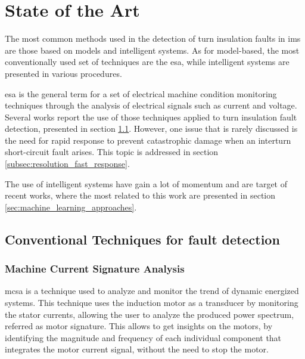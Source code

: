 \chapter{State of the Art}
\label{cha:state_of_the_art}

The most common methods used in the detection of turn insulation faults in \acrshort{ims} are those based on models and intelligent systems. As for model-based, the most conventionally used set of techniques are the \acrfull{esa}, while intelligent systems are presented in various 
procedures.

\acrshort{esa} is the general term for a set of electrical machine condition monitoring techniques through the analysis of electrical signals such as current and voltage. Several works report the use of those techniques applied to turn insulation fault detection, presented in section \ref{sec:conventional_techniques}. However, one issue that is rarely discussed is the need for rapid response to prevent catastrophic damage when an interturn short-circuit fault arises. This topic is addressed in section \ref{subsec:resolution_fast_response}.

The use of intelligent systems have gain a lot of momentum and are target of recent works, where the most related to this work are presented in section \ref{sec:machine_learning_approaches}.



\section{Conventional Techniques for fault detection} %
\label{sec:conventional_techniques}

\subsection{Machine Current Signature Analysis} %
\label{subsec:mcsa}
\acrfull{mcsa} is a technique used to analyze and monitor the trend of dynamic energized systems. This technique uses the induction motor as a transducer by monitoring the stator currents, allowing the user to analyze the produced power spectrum, referred as motor signature. This allows to get insights on the motors, by identifying the magnitude and frequency of each individual component that integrates the motor current signal, without the need to stop the motor. 

